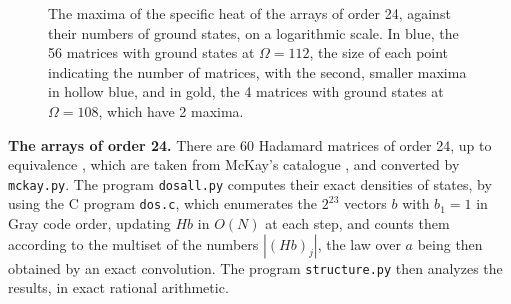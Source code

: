 \documentclass[11pt,a4paper]{article}
\theoremstyle{remark}
\begin{document}
\begin{figure}[htb!]
\centering
{}
\caption{The maxima of the specific heat of the arrays of order 24, against their numbers of ground states, on a logarithmic scale. In blue, the 56 matrices with ground states at $\Omega=112$, the size of each point indicating the number of matrices, with the second, smaller maxima in hollow blue, and in gold, the 4 matrices with ground states at $\Omega=108$, which have 2 maxima.}\label{fig:heat24}
\end{figure}

\noindent\textbf{The arrays of order 24.} There are 60 Hadamard matrices of order 24, up to equivalence \cite{ill,ki1,spe}, which are taken from McKay's catalogue \cite{mck}, and converted by \texttt{mckay.py}. The program \texttt{dosall.py} computes their exact densities of states, by using the C program \texttt{dos.c}, which enumerates the $2^{23}$ vectors $b$ with $b_1=1$ in Gray code order, updating $Hb$ in $O(N)$ at each step, and counts them according to the multiset of the numbers $|(Hb)_j|$, the law over $a$ being then obtained by an exact convolution. The program \texttt{structure.py} then analyzes the results, in exact rational arithmetic.
\end{document}
